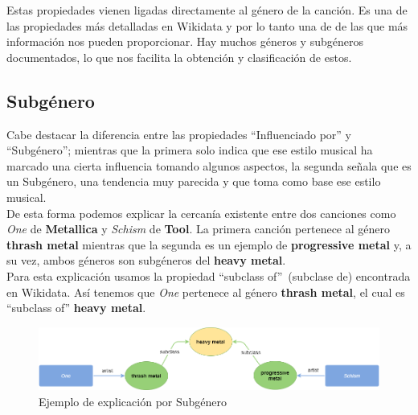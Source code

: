 Estas propiedades vienen ligadas directamente al género de la canción. Es una de las propiedades más detalladas en Wikidata y por lo tanto una de de las que más información nos pueden proporcionar. Hay muchos géneros y subgéneros documentados, lo que nos facilita la obtención y clasificación de estos.\\

\subsection*{Subgénero}

Cabe destacar la diferencia entre las propiedades ``Influenciado por'' y ``Subgénero''; mientras que la primera solo indica que ese estilo musical ha marcado una cierta influencia tomando algunos aspectos, la segunda señala que es un Subgénero, una tendencia muy parecida y que toma como base ese estilo musical.\\

De esta forma podemos explicar la cercanía existente entre dos canciones como \textit{One} de \textbf{Metallica} y \textit{Schism} de \textbf{Tool}. La primera canción pertenece al género \textbf{thrash metal} mientras que la segunda es un ejemplo de \textbf{progressive metal} y, a su vez, ambos géneros son subgéneros del \textbf{heavy metal}.\\

Para esta explicación usamos la propiedad ``subclass of''~(subclase de) encontrada en Wikidata. Así tenemos que \textit{One} pertenece al género \textbf{thrash metal}, el cual es ``subclass of'' \textbf{heavy metal}.\\

\begin{figure}[h!]
	\centering
	\includegraphics[width = 1\textwidth]{Imagenes/Bitmap/Subgenre.png}
	\caption{Ejemplo de explicación por Subgénero}
	\label{fig:sampleImage}
\end{figure}


